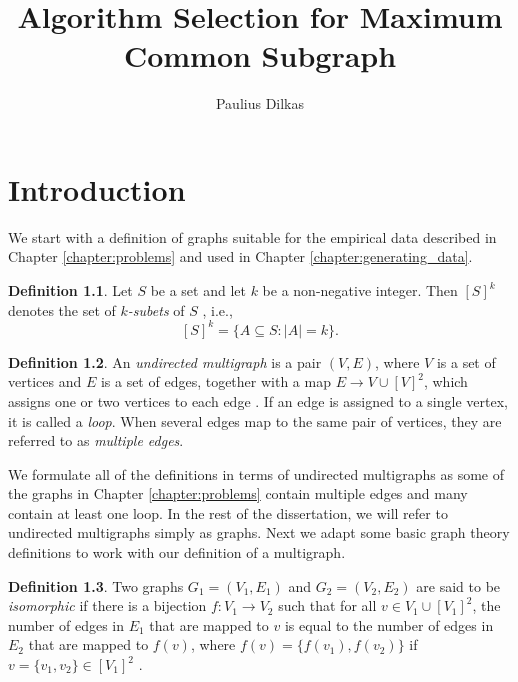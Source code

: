 \documentclass{l4proj}
\title{Algorithm Selection for Maximum Common Subgraph}
\author{Paulius Dilkas}
\theoremstyle{definition}
\newtheorem{definition}{Definition}[chapter]
\theoremstyle{remark}
\begin{document}
\maketitle


\educationalconsent
\tableofcontents

\chapter{Introduction}

We start with a definition of graphs suitable for the empirical data described
in Chapter \ref{chapter:problems} and used in Chapter
\ref{chapter:generating_data}.

\begin{definition}
  Let $S$ be a set and let $k$ be a non-negative integer. Then $[S]^k$ denotes
  the set of \emph{$k$-subets} of $S$ \cite{subset}, i.e.,
  \[ [S]^k = \{ A \subseteq S : |A| = k \}. \]
\end{definition}

\begin{definition} \label{def:graph}
  An \emph{undirected multigraph} is a pair $(V, E)$, where $V$ is a set of
  vertices and $E$ is a set of edges, together with a map $E \to V \cup [V]^2$,
  which assigns one or two vertices to each edge
  \cite{DBLP:books/daglib/0030488}. If an edge is assigned to a single vertex,
  it is called a \emph{loop}. When several edges map to the same pair of
  vertices, they are referred to as \emph{multiple edges}. 
\end{definition}

We formulate all of the definitions in terms of undirected multigraphs as some
of the graphs in Chapter \ref{chapter:problems} contain multiple edges and many
contain at least one loop. In the rest of the dissertation, we will refer to
undirected multigraphs simply as graphs. Next we adapt some basic graph theory
definitions to work with our definition of a multigraph.

\begin{definition}
  Two graphs $G_1 = (V_1, E_1)$ and $G_2 = (V_2, E_2)$ are said to be
  \emph{isomorphic} if there is a bijection $f \colon V_1 \to V_2$ such that
  for all $v \in V_1 \cup [V_1]^2$, the number of edges in $E_1$ that are mapped
  to $v$ is equal to the number of edges in $E_2$ that are mapped to $f(v)$,
  where $f(v) = \{ f(v_1), f(v_2) \}$ if $v = \{ v_1, v_2 \} \in [V_1]^2$
  \cite{DBLP:journals/jcamd/RaymondW02a}.
\end{definition}
\end{document}
